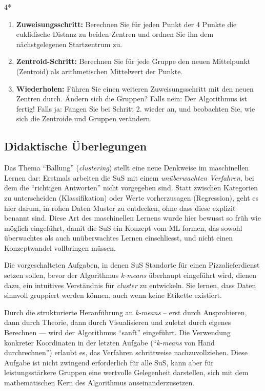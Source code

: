 \begin{lpu}
\begin{aufgabe}{4*}
\begin{enumerate}
  \item \textbf{Zuweisungsschritt:} Berechnen Sie für jeden Punkt der 4 Punkte die euklidische Distanz zu beiden Zentren und ordnen Sie ihn dem nächstgelegenen Startzentrum zu.

  \item \textbf{Zentroid-Schritt:} Berechnen Sie für jede Gruppe den neuen Mittelpunkt (Zentroid) als arithmetischen Mittelwert der Punkte.

  \item \textbf{Wiederholen:} Führen Sie einen weiteren Zuweisungsschritt mit den neuen Zentren durch. Ändern sich die Gruppen? Falls nein: Der Algorithmus ist fertig! Falls ja: Fangen Sie bei Schritt 2. wieder an, und beobachten Sie, wie sich die Zentroide und Gruppen verändern.

\end{enumerate}
\end{aufgabe}
\end{lpu}

\subsection*{Didaktische Überlegungen}


Das Thema ``Ballung'' (\textit{clustering}) stellt eine neue Denkweise im maschinellen Lernen dar: Erstmals arbeiten die SuS mit einem \emph{unüberwachten Verfahren}, bei dem die ``richtigen Antworten'' nicht vorgegeben sind. Statt zwischen Kategorien zu unterscheiden (Klassifikation) oder Werte vorherzusagen (Regression), geht es hier darum, in rohen Daten Muster zu entdecken, ohne dass diese explizit benannt sind. Diese Art des maschinellen Lernens wurde hier bewusst so früh wie möglich eingeführt, damit die SuS ein Konzept vom ML formen, das sowohl überwachtes als auch unüberwachtes Lernen einschliesst, und nicht einen Konzeptwandel vollbringen müssen.

Die vorgeschalteten Aufgaben, in denen SuS Standorte für einen Pizzalieferdienst setzen sollen, bevor der Algorithmus \textit{k-means} überhaupt eingeführt wird, dienen dazu, ein intuitives Verständnis für \textit{cluster} zu entwickeln. Sie lernen, dass Daten sinnvoll gruppiert werden können, auch wenn keine Etikette existiert.

Durch die strukturierte Heranführung an \textit{k-means} – erst durch Ausprobieren, dann durch Theorie, dann durch Visualisieren und zuletzt durch eigenes Berechnen — wird der Algorithmus ``sanft'' eingeführt. Die Verwendung konkreter Koordinaten in der letzten Aufgabe (``\textit{k-means} von Hand durchrechnen'') erlaubt es, das Verfahren schrittweise nachzuvollziehen. Diese Aufgabe ist nicht zwingend erforderlich für alle SuS, kann aber für leistungsstärkere Gruppen eine wertvolle Gelegenheit darstellen, sich mit dem mathematischen Kern des Algorithmus auseinanderzusetzen.

